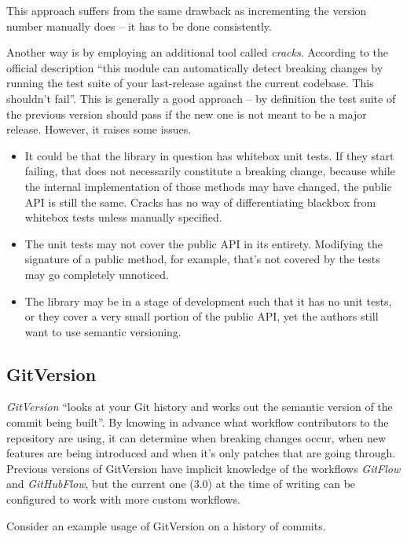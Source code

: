 \documentclass{l4proj}
\begin{document}
This approach suffers from the same drawback as incrementing the
version number manually does -- it has to be done consistently.

Another way is by employing an additional tool called
\textit{cracks}\cite{Cracks}. According to the official description
``this module can automatically detect breaking changes by running the
test suite of your last-release against the current codebase. This
shouldn't fail''. This is generally a good approach -- by definition
the test suite of the previous version should pass if the new one is
not meant to be a major release. However, it raises some issues.

\begin{itemize}
\item It could be that the library in question has whitebox unit
tests. If they start failing, that does not necessarily constitute a
breaking change, because while the internal implementation of those
methods may have changed, the public API is still the same. Cracks has
no way of differentiating blackbox from whitebox tests unless manually
specified.
\item The unit tests may not cover the public API in its entirety.
Modifying the signature of a public method, for example, that's not
covered by the tests may go completely unnoticed.
\item The library may be in a stage of development such that it has no
unit tests, or they cover a very small portion of the public API, yet
the authors still want to use semantic versioning.
\end{itemize}

\subsection{GitVersion}

\textit{GitVersion}\cite{GitVersion} ``looks at your Git history and
works out the semantic version of the commit being built''.  By
knowing in advance what workflow contributors to the repository are
using, it can determine when breaking changes occur, when new features
are being introduced and when it's only patches that are going
through. Previous versions of GitVersion have implicit knowledge of
the workflows \textit{GitFlow}\cite{GitFlow} and
\textit{GitHubFlow}\cite{GitHubFlow}, but the current one (3.0) at the
time of writing can be configured to work with more custom workflows.

Consider an example usage of GitVersion on a history of commits.
\end{document}
